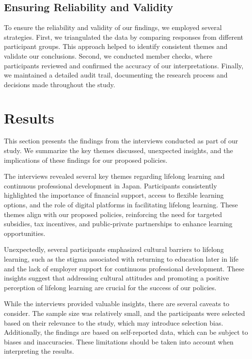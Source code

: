\documentclass{article} %
\begin{document}
\subsection{Ensuring Reliability and Validity}
To ensure the reliability and validity of our findings, we employed several strategies. First, we triangulated the data by comparing responses from different participant groups. This approach helped to identify consistent themes and validate our conclusions. Second, we conducted member checks, where participants reviewed and confirmed the accuracy of our interpretations. Finally, we maintained a detailed audit trail, documenting the research process and decisions made throughout the study.


\section{Results}
\label{sec:results}

This section presents the findings from the interviews conducted as part of our study. We summarize the key themes discussed, unexpected insights, and the implications of these findings for our proposed policies.

The interviews revealed several key themes regarding lifelong learning and continuous professional development in Japan. Participants consistently highlighted the importance of financial support, access to flexible learning options, and the role of digital platforms in facilitating lifelong learning. These themes align with our proposed policies, reinforcing the need for targeted subsidies, tax incentives, and public-private partnerships to enhance learning opportunities.

Unexpectedly, several participants emphasized cultural barriers to lifelong learning, such as the stigma associated with returning to education later in life and the lack of employer support for continuous professional development. These insights suggest that addressing cultural attitudes and promoting a positive perception of lifelong learning are crucial for the success of our policies.

While the interviews provided valuable insights, there are several caveats to consider. The sample size was relatively small, and the participants were selected based on their relevance to the study, which may introduce selection bias. Additionally, the findings are based on self-reported data, which can be subject to biases and inaccuracies. These limitations should be taken into account when interpreting the results.
\end{document}
